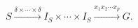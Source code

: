 \(\displaystyle
S \xrightarrow{\delta\times\cdots\times\delta}
I_S\times\cdots\times I_S
\xrightarrow{x_1x_2\cdots x_p}
G .
\)
